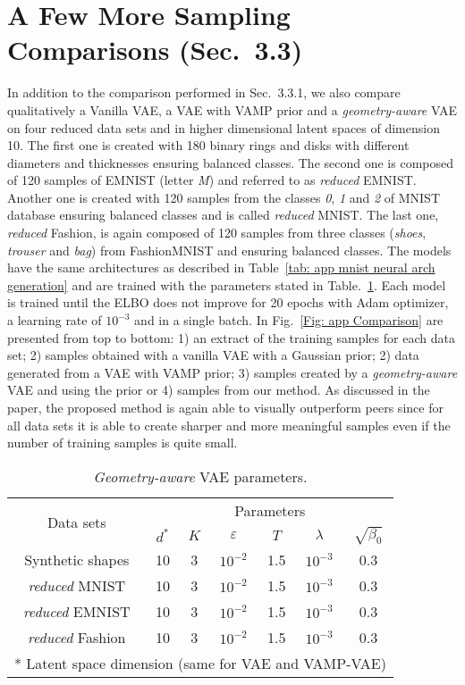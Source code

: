 \documentclass[10pt,journal,compsoc]{IEEEtran}
\begin{document}
\section{A Few More Sampling Comparisons (Sec.~3.3)}\label{appendix E}
In addition to the comparison performed in Sec.~3.3.1, we also compare qualitatively a Vanilla VAE, a VAE with VAMP prior and a \emph{geometry-aware} VAE on four reduced data sets and in higher dimensional latent spaces of dimension 10. The first one is created with 180 binary rings and disks with different diameters and thicknesses ensuring balanced classes. The second one is composed of 120 samples of EMNIST (letter \emph{M}) and referred to as \emph{reduced} EMNIST. Another one is created with 120 samples from the classes \emph{0}, \emph{1} and \emph{2} of MNIST database ensuring balanced classes and is called \emph{reduced} MNIST. The last one, \emph{reduced} Fashion, is again composed of 120 samples from three classes (\emph{shoes}, \emph{trouser} and \emph{bag}) from FashionMNIST and ensuring balanced classes.  
The models have the same architectures as described in Table~\ref{tab: app mnist neural arch generation} and are trained with the parameters stated in Table.~\ref{Table: app Hyper-parameters more gene}. Each model is trained until the ELBO does not improve for 20 epochs with Adam optimizer, a learning rate of $10^{-3}$ and in a single batch. In Fig.~\ref{Fig: app Comparison} are presented from top to bottom: 1) an extract of the training samples for each data set; 2) samples obtained with a vanilla VAE with a Gaussian prior; 2)  data generated from a VAE with VAMP prior; 3) samples created by a \emph{geometry-aware} VAE and using the prior or 4) samples from our method. As discussed in the paper, the proposed method is again able to visually outperform peers since for all data sets it is able to create sharper and more meaningful samples even if the number of training samples is quite small.  


\begin{table}[ht]
  \centering
  \caption{\emph{Geometry-aware} VAE parameters.}
  \label{Table: app Hyper-parameters more gene}
  \begin{tabular}{c|cccccc}
  \hline
       \multirow{2}{*}{Data sets} & \multicolumn{6}{c}{Parameters} \\
       & $d^{*}$  & $K$ & $\varepsilon$ & $T$ & $\lambda$ & $\sqrt{\beta_0}$   \\
      \hline
      Synthetic shapes              & 10 & 3 & $10^{-2}$ & 1.5 & $10^{-3}$ & 0.3 \\
      \textit{reduced} MNIST        & 10 & 3 & $10^{-2}$ & 1.5 & $10^{-3}$ & 0.3 \\
      \textit{reduced} EMNIST       & 10 & 3 & $10^{-2}$ & 1.5 & $10^{-3}$ & 0.3 \\
      \textit{reduced} Fashion      & 10 & 3 & $10^{-2}$ & 1.5 & $10^{-3}$ & 0.3 \\
      \hline
      \multicolumn{7}{l}{\scriptsize{* Latent space dimension (same for VAE and VAMP-VAE)}} 
  \end{tabular}
\end{table}
\end{document}
